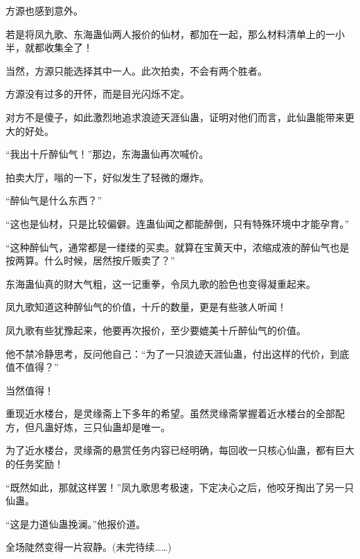 \begin{this_body}
方源也感到意外。

若是将凤九歌、东海蛊仙两人报价的仙材，都加在一起，那么材料清单上的一小半，就都收集全了！

当然，方源只能选择其中一人。此次拍卖，不会有两个胜者。

方源没有过多的开怀，而是目光闪烁不定。

对方不是傻子，如此激烈地追求浪迹天涯仙蛊，证明对他们而言，此仙蛊能带来更大的好处。

“我出十斤醉仙气！”那边，东海蛊仙再次喊价。

拍卖大厅，嗡的一下，好似发生了轻微的爆炸。

“醉仙气是什么东西？”

“这也是仙材，只是比较偏僻。连蛊仙闻之都能醉倒，只有特殊环境中才能孕育。”

“这种醉仙气，通常都是一缕缕的买卖。就算在宝黄天中，浓缩成液的醉仙气也是按两算。什么时候，居然按斤贩卖了？”

东海蛊仙真的财大气粗，这一记重拳，令凤九歌的脸色也变得凝重起来。

凤九歌知道这种醉仙气的价值，十斤的数量，更是有些骇人听闻！

凤九歌有些犹豫起来，他要再次报价，至少要媲美十斤醉仙气的价值。

他不禁冷静思考，反问他自己：“为了一只浪迹天涯仙蛊，付出这样的代价，到底值不值得？”

当然值得！

重现近水楼台，是灵缘斋上下多年的希望。虽然灵缘斋掌握着近水楼台的全部配方，但凡蛊好炼，三只仙蛊却是唯一。

为了近水楼台，灵缘斋的悬赏任务内容已经明确，每回收一只核心仙蛊，都有巨大的任务奖励！

“既然如此，那就这样罢！”凤九歌思考极速，下定决心之后，他咬牙掏出了另一只仙蛊。

“这是力道仙蛊挽澜。”他报价道。

全场陡然变得一片寂静。(未完待续……)

\end{this_body}

